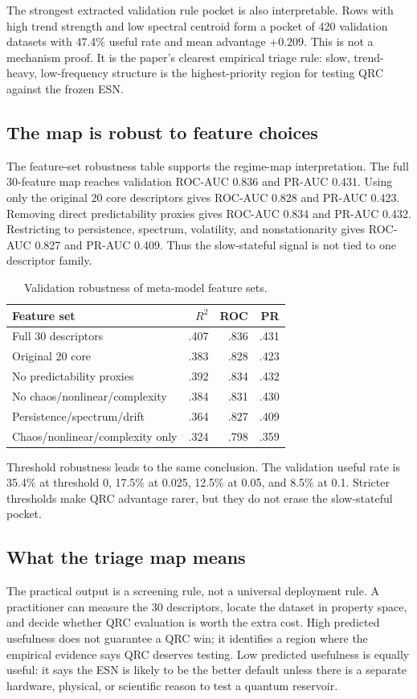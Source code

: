The strongest extracted validation rule pocket is also interpretable. Rows with high trend strength and low spectral centroid form a pocket of 420 validation datasets with 47.4\% useful rate and mean advantage \(+0.209\). This is not a mechanism proof. It is the paper's clearest empirical triage rule: slow, trend-heavy, low-frequency structure is the highest-priority region for testing QRC against the frozen ESN.

\subsection{The map is robust to feature choices}

The feature-set robustness table supports the regime-map interpretation. The full 30-feature map reaches validation ROC-AUC 0.836 and PR-AUC 0.431. Using only the original 20 core descriptors gives ROC-AUC 0.828 and PR-AUC 0.423. Removing direct predictability proxies gives ROC-AUC 0.834 and PR-AUC 0.432. Restricting to persistence, spectrum, volatility, and nonstationarity gives ROC-AUC 0.827 and PR-AUC 0.409. Thus the slow-stateful signal is not tied to one descriptor family.

\begin{table}[!t]
\centering
\caption{Validation robustness of meta-model feature sets.}
\label{tab:feature-robustness}
\scriptsize
\setlength{\tabcolsep}{3.2pt}
\renewcommand{\arraystretch}{1.04}
\begin{tabular}{lrrr}
\toprule
Feature set & \(R^2\) & ROC & PR \\
\midrule
Full 30 descriptors & .407 & .836 & .431 \\
Original 20 core & .383 & .828 & .423 \\
No predictability proxies & .392 & .834 & .432 \\
No chaos/nonlinear/complexity & .384 & .831 & .430 \\
Persistence/spectrum/drift & .364 & .827 & .409 \\
Chaos/nonlinear/complexity only & .324 & .798 & .359 \\
\bottomrule
\end{tabular}
\end{table}

Threshold robustness leads to the same conclusion. The validation useful rate is 35.4\% at threshold 0, 17.5\% at 0.025, 12.5\% at 0.05, and 8.5\% at 0.1. Stricter thresholds make QRC advantage rarer, but they do not erase the slow-stateful pocket.

\subsection{What the triage map means}

The practical output is a screening rule, not a universal deployment rule. A practitioner can measure the 30 descriptors, locate the dataset in property space, and decide whether QRC evaluation is worth the extra cost. High predicted usefulness does not guarantee a QRC win; it identifies a region where the empirical evidence says QRC deserves testing. Low predicted usefulness is equally useful: it says the ESN is likely to be the better default unless there is a separate hardware, physical, or scientific reason to test a quantum reservoir.
